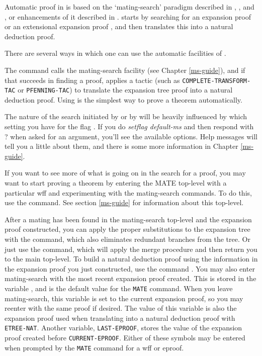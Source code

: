 
Automatic proof in {\TPS} is based on the `mating-search' paradigm described
in \cite{Andrews2002a}, \cite{Andrews81},  and \cite{Andrews89}, or
enhancements of it described in \cite{Bishop99,Bishop99a,Brown2002,
Brown2004a}.
{\TPS} starts by searching for an expansion proof
\cite{Miller84,Miller87,Andrews89}
or an extensional expansion proof \cite{Brown2004a}, and
then translates this into a natural deduction proof.

There are several ways in which one can use the automatic facilities of \TPS.


The command  calls the mating-search facility
(see Chapter \ref{ms-guide}), and if that succeeds in finding a proof, applies a
tactic (such as {\tt COMPLETE-TRANSFORM-TAC} or {\tt PFENNING-TAC}) to
translate the expansion tree proof  into a natural
deduction proof. Using   is the simplest way to
prove a theorem automatically.

The nature of the search initiated by  or by
 will be heavily influenced by which setting you have
for the flag . If you do {\it setflag default-ms} and
then respond with ? when asked for an argument, you'll see the
available options.  Help messages will tell you a little about them, and
there is some more information in Chapter \ref{ms-guide}.


If you want to see more of what is going on in the search for a proof,
you may want to start proving a theorem by entering
the  MATE top-level with a particular wff and
experimenting with the mating-search commands.  To do this, use the
 command. See section \ref{ms-guide} for information
about this top-level.

After a mating has been found in the mating-search top-level and the
expansion proof constructed, you can apply the proper substitutions to
the expansion tree with the  command, which
also eliminates redundant branches from the tree.  Or just use the
 command, which will apply the merge procedure and
then return you to the main top-level.  To build a natural deduction
proof using the information in the expansion proof you just
constructed, use the command .  You may also
enter mating-search with the most recent expansion proof created.
This is stored in the variable {\tt {}},
and is the default
value for the {\tt MATE} command.  When you leave mating-search, this
variable is set to the current expansion proof, so you may reenter
with the same proof if desired.  The value of this variable is also
the expansion proof used when translating into a natural deduction
proof with {\tt ETREE-NAT}.  Another variable, {\tt LAST-EPROOF}, stores
the value of the expansion proof created before {\tt CURRENT-EPROOF}.
Either of these symbols may be entered when prompted by the {\tt MATE}
command for a wff or eproof.

